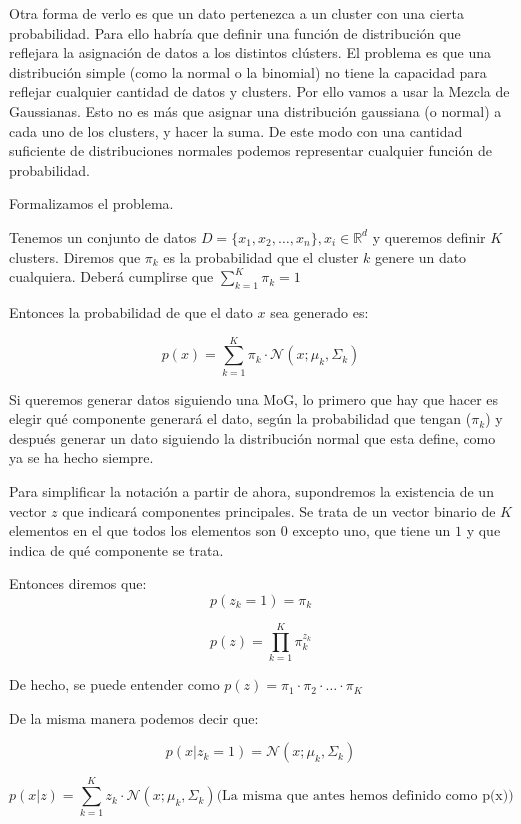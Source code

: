 \documentclass[a4paper,10pt]{article}
\begin{document}
Otra forma de verlo es que un dato pertenezca a un cluster con una cierta probabilidad. Para ello habría que definir una función de distribución que reflejara la asignación de datos a los distintos clústers. El problema es que una distribución simple (como la normal o la binomial) no tiene la capacidad para reflejar cualquier cantidad de datos y clusters. Por ello vamos a usar la Mezcla de Gaussianas. Esto no es más que asignar una distribución gaussiana (o normal) a cada uno de los clusters, y hacer la suma. De este modo con una cantidad suficiente de distribuciones normales podemos representar cualquier función de probabilidad.

Formalizamos el problema.

Tenemos un conjunto de datos $D = \{x_1, x_2, \dots, x_n\}, x_i \in \mathbb{R}^d$ y queremos definir $K$ clusters. Diremos que $\pi_k$ es la probabilidad que el cluster $k$ genere un dato cualquiera. Deberá cumplirse que $\sum_{k = 1}^K \pi_k = 1$

Entonces la probabilidad de que el dato $x$ sea generado es:

\begin{equation*}
p(x) = \sum_{k = 1}^{K} \pi_k \cdot \mathcal{N}(x; \mu_k, \Sigma_k)
\end{equation*}

Si queremos generar datos siguiendo una MoG, lo primero que hay que hacer es elegir qué componente generará el dato, según la probabilidad que tengan ($\pi_k$) y después generar un dato siguiendo la distribución normal que esta define, como ya se ha hecho siempre.

Para simplificar la notación a partir de ahora, supondremos la existencia de un vector $z$ que indicará componentes principales. Se trata de un vector binario de $K$ elementos en el que todos los elementos son $0$ excepto uno, que tiene un $1$ y que indica de qué componente se trata.

Entonces diremos que:
\begin{equation*}
p(z_k = 1) = \pi_k
\end{equation*}

\begin{equation*}
p(z) = \prod_{k = 1}^{K} \pi_k^{z_k}
\end{equation*}

De hecho, se puede entender como $p(z) = \pi_1 \cdot \pi_2 \cdot \dots \cdot \pi_K$

De la misma manera podemos decir que:

\begin{equation*}
p(x | z_k = 1) = \mathcal{N}(x; \mu_k, \Sigma_k)
\end{equation*}

\begin{equation*}
p(x | z) = \sum_{k = 1}^{K} z_k \cdot \mathcal{N}(x; \mu_k, \Sigma_k) \text{(La misma que antes hemos definido como p(x))}
\end{equation*}
\end{document}
